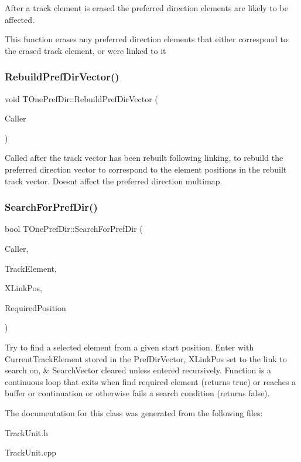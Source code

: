 After a track element is erased the preferred direction elements are likely to be affected.

This function erases any preferred direction elements that either correspond to the erased track element, or were linked to it \mbox{\label{class_t_one_pref_dir_a1e62c2571d3629a067e1071086de72de}} 
\subsubsection{\texorpdfstring{Rebuild\+Pref\+Dir\+Vector()}{RebuildPrefDirVector()}}
{\footnotesize\ttfamily void T\+One\+Pref\+Dir\+::\+Rebuild\+Pref\+Dir\+Vector (\begin{DoxyParamCaption}\item[{int}]{Caller }\end{DoxyParamCaption})}

Called after the track vector has been rebuilt following linking, to rebuild the preferred direction vector to correspond to the element positions in the rebuilt track vector. Doesn\textquotesingle{}t affect the preferred direction multimap. \mbox{\label{class_t_one_pref_dir_a82c6a19d67ada7059491afae05ced4a4}} 
\subsubsection{\texorpdfstring{Search\+For\+Pref\+Dir()}{SearchForPrefDir()}}
{\footnotesize\ttfamily bool T\+One\+Pref\+Dir\+::\+Search\+For\+Pref\+Dir (\begin{DoxyParamCaption}\item[{int}]{Caller,  }\item[{\mbox{\hyperlink{class_t_track_element}{T\+Track\+Element}}}]{Track\+Element,  }\item[{int}]{X\+Link\+Pos,  }\item[{int}]{Required\+Position }\end{DoxyParamCaption})\hspace{0.3cm}{\ttfamily [protected]}}

Try to find a selected element from a given start position. Enter with Current\+Track\+Element stored in the Pref\+Dir\+Vector, X\+Link\+Pos set to the link to search on, \& Search\+Vector cleared unless entered recursively. Function is a continuous loop that exits when find required element (returns true) or reaches a buffer or continuation or otherwise fails a search condition (returns false). 

The documentation for this class was generated from the following files\+:\begin{DoxyCompactItemize}
\item 
Track\+Unit.\+h\item 
Track\+Unit.\+cpp\end{DoxyCompactItemize}
